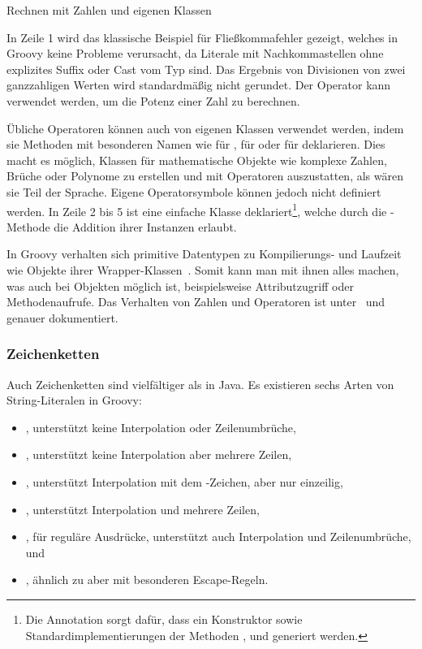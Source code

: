 \documentclass[a4paper]{article}
\newcommand{\codelisting}[3]{\begin{listing}[htp]
	\inputminted{#1}{#1/#2}
	\vspace{-3ex}
	\caption{#3}
	\label{lst:#2}
\end{listing}}
\begin{document}
\codelisting{groovy}{numbers.groovy}{Rechnen mit Zahlen und eigenen Klassen}

In Zeile 1 wird das klassische Beispiel für Fließkommafehler gezeigt, welches in Groovy keine Probleme verursacht, da Literale mit Nachkommastellen ohne explizites Suffix oder Cast vom Typ  sind.
Das Ergebnis von Divisionen von zwei ganzzahligen Werten wird standardmäßig nicht gerundet.
Der Operator \code{**} kann verwendet werden, um die Potenz einer Zahl zu berechnen.

Übliche Operatoren können auch von eigenen Klassen verwendet werden, indem sie Methoden mit besonderen Namen wie  für \code{+},  für \code{<<} oder  für \code{++} deklarieren.
Dies macht es möglich, Klassen für mathematische Objekte wie komplexe Zahlen, Brüche oder Polynome zu erstellen und mit Operatoren auszustatten, als wären sie Teil der Sprache.
Eigene Operatorsymbole können jedoch nicht definiert werden.
In Zeile 2 bis 5 ist eine einfache Klasse  deklariert\footnote{Die Annotation  sorgt dafür, dass ein Konstruktor sowie Standardimplementierungen der Methoden ,  und  generiert werden.}, welche durch die -Methode die Addition ihrer Instanzen erlaubt.

In Groovy verhalten sich primitive Datentypen zu Kompilierungs- und Laufzeit wie Objekte ihrer Wrapper-Klassen~\cite[Abs.~3.2.10.]{groovy-lang:documentation}.
Somit kann man mit ihnen alles machen, was auch bei Objekten möglich ist, beispielsweise Attributzugriff oder Methodenaufrufe.
Das Verhalten von Zahlen und Operatoren ist unter~\cite[Abs.~1.1.5.]{groovy-lang:documentation} und~\cite[Abs.~1.2.]{groovy-lang:documentation} genauer dokumentiert.

\subsubsection{Zeichenketten}\label{subsubsec:strings}

Auch Zeichenketten sind vielfältiger als in Java.
Es existieren sechs Arten von String-Literalen in Groovy:

\begin{itemize}\setlength{\itemsep}{0pt}\setlength{\parskip}{0pt}\setlength{\parsep}{0pt}
\item {}, unterstützt keine Interpolation oder Zeilenumbrüche,
\item {}, unterstützt keine Interpolation aber mehrere Zeilen,
\item {}, unterstützt Interpolation mit dem \code{$}-Zeichen, aber nur einzeilig,
\item {}, unterstützt Interpolation und mehrere Zeilen,
\item {}, für reguläre Ausdrücke, unterstützt auch Interpolation und Zeilenumbrüche, und
\item {}, ähnlich zu  aber mit besonderen Escape-Regeln.
\end{itemize}
\end{document}
